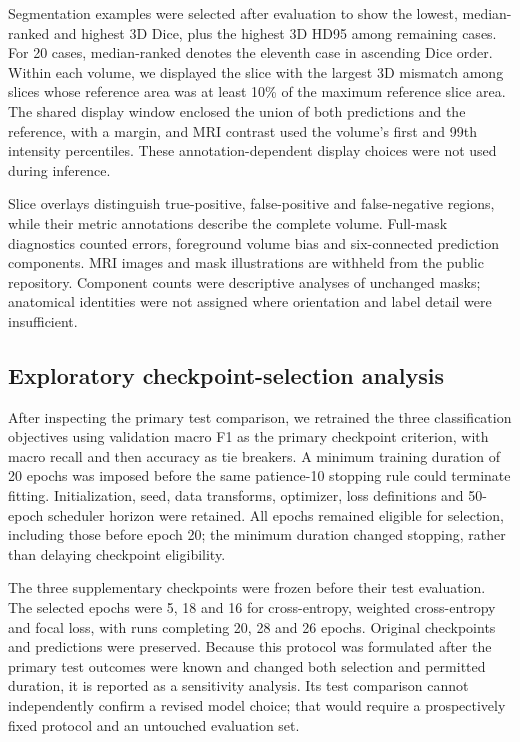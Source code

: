 \documentclass[11pt,a4paper]{article}
\begin{document}
Segmentation examples were selected after evaluation to show the lowest, median-ranked and highest 3D Dice, plus the highest 3D HD95 among remaining cases. For 20 cases, median-ranked denotes the eleventh case in ascending Dice order. Within each volume, we displayed the slice with the largest 3D mismatch among slices whose reference area was at least 10\% of the maximum reference slice area. The shared display window enclosed the union of both predictions and the reference, with a margin, and MRI contrast used the volume's first and 99th intensity percentiles. These annotation-dependent display choices were not used during inference.



Slice overlays distinguish true-positive, false-positive and false-negative regions, while their metric annotations describe the complete volume. Full-mask diagnostics counted errors, foreground volume bias and six-connected prediction components. MRI images and mask illustrations are withheld from the public repository. Component counts were descriptive analyses of unchanged masks; anatomical identities were not assigned where orientation and label detail were insufficient.



\subsection*{Exploratory checkpoint-selection analysis}

After inspecting the primary test comparison, we retrained the three classification objectives using validation macro F1 as the primary checkpoint criterion, with macro recall and then accuracy as tie breakers. A minimum training duration of 20 epochs was imposed before the same patience-10 stopping rule could terminate fitting. Initialization, seed, data transforms, optimizer, loss definitions and 50-epoch scheduler horizon were retained. All epochs remained eligible for selection, including those before epoch 20; the minimum duration changed stopping, rather than delaying checkpoint eligibility.



The three supplementary checkpoints were frozen before their test evaluation. The selected epochs were 5, 18 and 16 for cross-entropy, weighted cross-entropy and focal loss, with runs completing 20, 28 and 26 epochs. Original checkpoints and predictions were preserved. Because this protocol was formulated after the primary test outcomes were known and changed both selection and permitted duration, it is reported as a sensitivity analysis. Its test comparison cannot independently confirm a revised model choice; that would require a prospectively fixed protocol and an untouched evaluation set.
\end{document}
